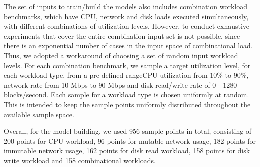 % 
% 


The set of inputs to train/build the models also includes 
combination workload benchmarks, which have CPU, network and disk
loads executed simultaneously, with different combinations of 
utilization levels.
However, to conduct exhaustive experiments that cover the
entire combination input set is not possible, since there is an
exponential number of cases in the input space of combinational load.
Thus, we adopted a workaround of choosing a set of random input 
workload levels. 
For each combination benchmark, we sample a target utilization level, for 
each workload type, from a pre-defined range\textemdash{}CPU utilization from $10\%$ to 
$90\%$, network rate from 10 Mbps to 90 Mbps and disk read/write rate
of $0$ - $1280$ blocks/second. Each sample for a workload type is chosen
uniformly at random. 
This is intended to keep the sample points
uniformly distributed throughout the available sample space. 

Overall, for the model building, we used 956 sample points in total, consisting
of 200 points for CPU workload, 96 points for mutable network usage, 182 points
for immutable network usage, 162 points for disk read workload, 158 points for disk write 
workload and 158 combinational workloads.




